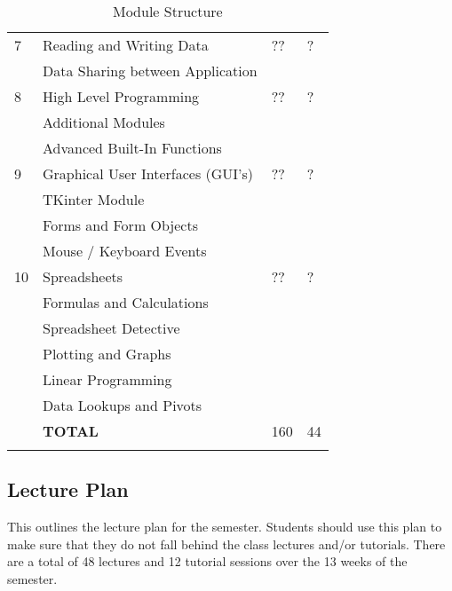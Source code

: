 \begin{longtable}{|p{2.0cm}|p{7.6cm}|p{2.0cm}|p{1.8cm}|}
             \hline
             7  & Reading and Writing Data                   & ?? & ?  \\
                & \qquad Data Sharing between Application    &    &    \\
             \hline
             8  & High Level Programming                     & ?? & ?  \\
                & \qquad Additional Modules                  &    &    \\
                & \qquad Advanced Built-In Functions         &    &    \\
             \hline
             9  & Graphical User Interfaces (GUI's)          & ?? & ?  \\
                & \qquad TKinter Module                      &    &    \\
                & \qquad Forms and Form Objects              &    &    \\
                & \qquad Mouse / Keyboard Events             &    &    \\
             \hline
             10 & Spreadsheets                               & ?? & ?  \\
                & \qquad Formulas and Calculations           &    &    \\
                & \qquad Spreadsheet Detective               &    &    \\
                & \qquad Plotting and Graphs                 &    &    \\
                & \qquad Linear Programming                  &    &    \\
                & \qquad Data Lookups and Pivots             &    &    \\
             \hline
                & {\bf TOTAL}                                &160 & 44 \\
             \hline

             \caption[Module Structure]{Module Structure} \label{tab:study_comp} \\
        \end{longtable}

    \subsection{Lecture Plan}
        This outlines the lecture plan for the semester. Students should use
        this plan to make sure that they do not fall behind the class
        lectures and/or tutorials. There are a total of 48 lectures and 12
        tutorial sessions over the 13 weeks of the semester.

